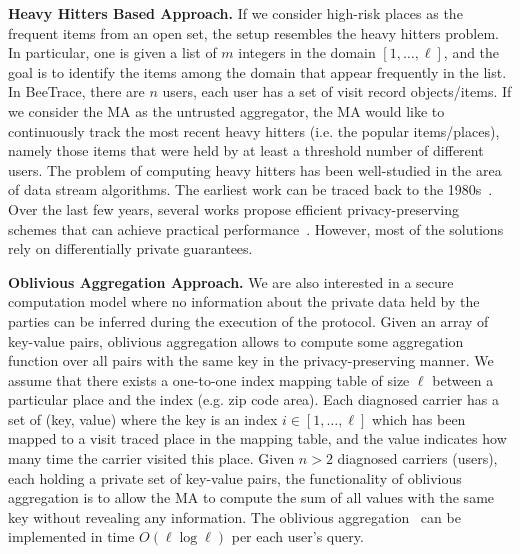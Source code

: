 \documentclass[11pt,dvipdfmx]{article}  %
\newcommand{\sysname}{\textsf{BeeTrace}\xspace}
\begin{document}
\textbf{Heavy Hitters Based Approach.} If we consider high-risk places as the frequent items from an open set, the setup resembles the heavy hitters problem. In particular, one is given a list of $m$ integers in the domain $[1, \ldots, \ell]$, and the goal is to identify the items among the domain that appear frequently in the list. In \sysname, there are $n$ users, each user has a set of visit record objects/items. If we consider the MA as the untrusted aggregator, the MA would like to continuously track the most recent heavy hitters (i.e. the popular items/places), namely those items that were held by at least a threshold number of different users. %
The problem of computing heavy hitters has been well-studied in the area of data stream algorithms. The earliest work can be traced back to the 1980s~\cite{BoyerHeavyhitter81}. Over the last few years, several works propose  efficient privacy-preserving schemes that can achieve practical performance~\cite{BassilyNeurIPs17}. However, most of the solutions rely on  differentially private guarantees. 

\textbf{Oblivious Aggregation Approach.} We are also interested in a secure computation model where no information about the private data held by the parties can be inferred during the execution of the protocol.  Given an array of key-value pairs, oblivious aggregation allows to compute some aggregation function over all pairs with the same key in the privacy-preserving manner. %
We assume that there exists a one-to-one index mapping table of size $\ell$ between a particular place and the index (e.g. zip code area). Each diagnosed carrier has a set of (key, value) where the key is an index $i \in [1, \ldots, \ell]$ which has been mapped to a visit traced place in the mapping table, and the value indicates how many time the carrier visited this place. Given $n>2$ diagnosed carriers (users), each holding a private set of key-value pairs, the functionality of oblivious aggregation is to allow the MA to compute the sum of all values with the same key without revealing any information. The oblivious aggregation~\cite{Boyle2016, SOda19} can be implemented in time $O(\ell \log \ell)$ per each user's query. %

\end{document}
